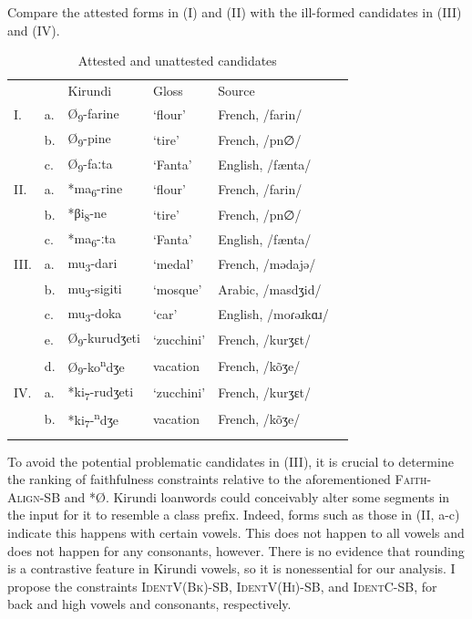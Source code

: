 \documentclass[output=paper,colorlinks,citecolor=brown,
]{langscibook}
\begin{document}
Compare the attested forms in  (\textsc{I}) and (\textsc{II}) with the ill-formed candidates in  (\textsc{III}) and (\textsc{IV}).

\begin{table}
\caption{Attested and unattested candidates}
\label{tab:kinchsular:attestedunattested}
\begin{tabular}{llllll}
  \lsptoprule
        & & {Kirundi} & {Gloss} & {Source} \\
       \textsc{I}. & a. & {Ø}\textsubscript{9}-farine & `flour' & French, /farin/ \\ 
            & b. & {Ø}\textsubscript{9}-pine & `tire' & French, /pn∅/ \\ 
            & c. & {Ø}\textsubscript{9}-faːta & `Fanta' & English, /fænta/ \\ \midrule
        \textsc{II}. & a. & *ma\textsubscript{6}-rine & `flour' & French, /farin/ \\ 
            & b. & *βi\textsubscript{8}-ne & `tire' & French, /pn∅/ \\ 
            & c. & *ma\textsubscript{6}-ːta & `Fanta' & English, /fænta/  \\ \midrule
        \textsc{III}. & a. & mu\textsubscript{3}-dari & `medal' & French, /mədajə/ \\ 
            & b. & mu\textsubscript{3}-sigiti & `mosque' & Arabic, /masdʒid/  \\ 
            & c. & mu\textsubscript{3}-doka & `car' & English, /moɾəɹkɑɹ/  \\
            & e. & {Ø}\textsubscript{9}-kurudʒeti & `zucchini' & French, /kurʒɛt/ \\
           &  d. & {Ø}\textsubscript{9}-ko\textsuperscript{n}dʒe & vacation & French, /k\~{o}ʒe/ \\ \midrule 
        \textsc{IV}. & a.  & *ki\textsubscript{7}-rudʒeti & `zucchini' & French, /kurʒɛt/ \\
           &  b. & *ki\textsubscript{7}-\textsuperscript{n}dʒe & vacation & French, /k\~{o}ʒe/ \\
  \lspbottomrule
\end{tabular}
\end{table}

 To avoid the potential problematic candidates in  (\textsc{III}), it is crucial to determine the ranking of faithfulness constraints relative to the aforementioned \textsc{Faith-Align-SB} and *{Ø}. Kirundi loanwords could conceivably alter some segments in the input for it to resemble a class prefix. Indeed, forms such as those in  (\textsc{II}, a-c) indicate this happens with certain vowels. This does not happen to all vowels and does not happen for any consonants, however. There is no evidence that rounding is a contrastive feature in Kirundi vowels, so it is nonessential for our analysis. I propose the constraints \textsc{IdentV(Bk)-SB}, \textsc{IdentV(Hi)-SB}, and \textsc{Ident}C-SB, for back and high vowels and consonants, respectively. 
\end{document}
